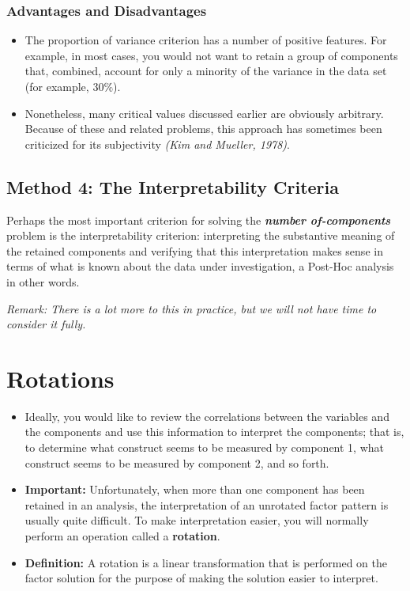 \documentclass[a4paper,12pt]{article}
\begin{document}
\subsubsection*{Advantages and Disadvantages}
\begin{itemize}
	\item The proportion of variance criterion has a number of positive features.  For example, in most
	cases, you would not want to retain a group of components that, combined, account for only a
	minority of the variance in the data set (for example, $30\%$).  \item Nonetheless, many critical values discussed
	earlier are obviously arbitrary.  Because of these and related problems, this approach has sometimes been
	criticized for its subjectivity \textit{(Kim and Mueller, 1978)}.
\end{itemize}


\subsection{Method 4: The Interpretability Criteria}

Perhaps the most important criterion for solving the \textbf{\emph{number of-components}} problem is the interpretability criterion:  interpreting the substantive meaning of the retained components and verifying that this interpretation makes sense in terms of what is known about the data under investigation, a Post-Hoc analysis in other words.\\
\medskip

\noindent \textit{Remark: There is a lot more to this in practice, but we will not have time to consider it fully.}


\section{Rotations}
\begin{itemize}
	\item  Ideally, you would like to review the correlations between the variables and the
	components and use this information to interpret the components; that is, to determine what
	construct seems to be measured by component 1, what construct seems to be measured by
	component 2, and so forth.
	\item \textbf{Important:}  Unfortunately, when more than one component has been retained in
	an analysis, the interpretation of an unrotated factor pattern is usually quite difficult. To make
	interpretation easier, you will normally perform an operation called a \textbf{rotation}. 
	\item \textbf{Definition:} A rotation is a
	linear transformation that is performed on the factor solution for the purpose of making the
	solution easier to interpret. 
\end{itemize}
\end{document}
